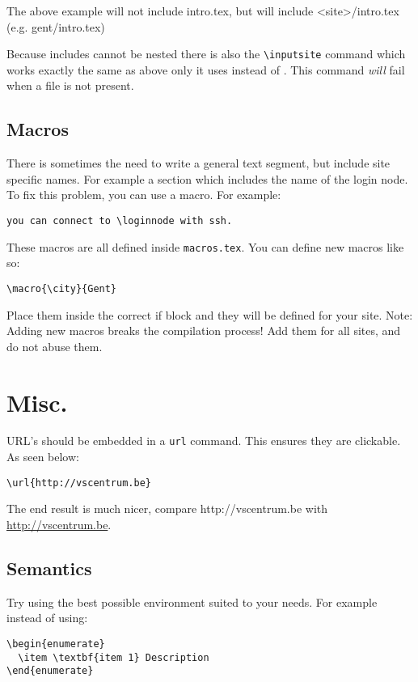 \documentclass[11pt,a4paper]{article}
\begin{document}
The above example will not include intro.tex, but will include <site>/intro.tex (e.g. gent/intro.tex)

Because includes cannot be nested there is also the \verb|\inputsite| command
which works exactly the same as above only it uses \verb|| instead of
\verb||. This command \emph{will} fail when a file is not present.

\subsection{Macros}
\label{sec:macros}

There is sometimes the need to write a general text segment, but include site
specific names. For example a section which includes the name of the login node.
To fix this problem, you can use a macro. For example:

\begin{verbatim}
you can connect to \loginnode with ssh.
\end{verbatim}

These macros are all defined inside \verb|macros.tex|. You can define new macros like so:
\begin{verbatim}
\macro{\city}{Gent}
\end{verbatim}

Place them inside the correct if block and they will be defined for your site.
Note: Adding new macros breaks the compilation process! Add them for all sites,
and do not abuse them.

\section{Misc.}
\label{sec:misc}

URL's should be embedded in a \texttt{url} command. This ensures they are clickable. As seen below:
\begin{verbatim}
\url{http://vscentrum.be}
\end{verbatim}

The end result is much nicer, compare http://vscentrum.be with \url{http://vscentrum.be}.

\subsection{Semantics}

Try using the best possible environment suited to your needs. For example instead of using:
\begin{verbatim}
\begin{enumerate}
  \item \textbf{item 1} Description
\end{enumerate}
\end{verbatim}
\end{document}
